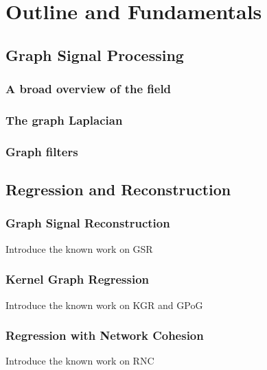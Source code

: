 \chapter{Outline and Fundamentals} %

\label{chap:outline} %



\section{Graph Signal Processing}


\subsection{A broad overview of the field}


\subsection{The graph Laplacian}


\subsection{Graph filters}


\section{Regression and Reconstruction}


\subsection{Graph Signal Reconstruction}

Introduce the known work on GSR


\subsection{Kernel Graph Regression}

Introduce the known work on KGR and GPoG

\subsection{Regression with Network Cohesion}


Introduce the known work on RNC 

